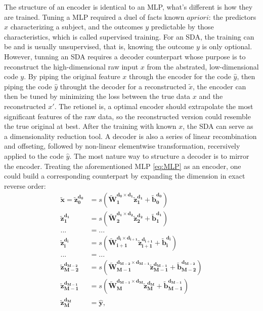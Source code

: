 The structure of an encoder is identical to an MLP, what's different is how they are trained. Tuning a MLP required a duel of facts known $a priori$: the predictors $x$ characterizing a subject, and the outcomes $y$ predictable by those characteristics, which is called supervised training. For an SDA, the training can be and is usually unsupervised, that is, knowing the outcome $y$ is only optional. However, tunning an SDA requires a decoder counterpart whose purpose is to reconstruct the  high-dimensional raw input $x$ from the abstrated, low-dimensional code $y$. By piping the original feature $x$ through the encoder for the code $\hat{y}$, then piping the code $\hat{y}$ throught the decoder for a reconstructed $\tilde{x}$, the encoder can then be tuned by minimizing the loss between the true data $x$ and the reconstructed $x'$. The retionel is, a optimal encoder should extrapolate the most significant features of the raw data, so the reconstructed version could resemble the true original at best. After the training with known $x$, the SDA can serve as a dimensionality reduction tool.
A decoder is also a series of linear recombination and offseting, followed by non-linear elementwise transformation, recersively applied to the code $\hat{y}$. The most nature way to structure a decoder is to mirror the encoder. Treating the aforementioned MLP \ref{eq:MLP} as an encoder, one could build a corresponding counterpart by expanding the dimension in exact reverse order:
\begin{equation} \label{eq:DEC}
\begin{split}
  \boldsymbol{\tilde{x}}=
  \boldsymbol{\tilde{z}_{0  }^{d_{0  }}} &= s(\boldsymbol{\tilde{W}_{1  }^{d_{0  } \times d_{1  }} \tilde{z}_{1  }^{d_{1  }}}+\boldsymbol{\tilde{b}_{0  }^{d_{0  }}}) \\
  \boldsymbol{\tilde{z}_{1  }^{d_{1  }}} &= s(\boldsymbol{\tilde{W}_{2  }^{d_{1  } \times d_{2  }} \tilde{z}_{2  }^{d_{2  }}}+\boldsymbol{\tilde{b}_{1  }^{d_{1  }}}) \\
  ... &= ... \\
  \boldsymbol{\tilde{z}_{i  }^{d_{i  }}} &= s(\boldsymbol{\tilde{W}_{i+1}^{d_{i  } \times d_{i+1}} \tilde{z}_{i+1}^{d_{i+1}}}+\boldsymbol{\tilde{b}_{i  }^{d_{i  }}}) \\
  ... &= ... \\
  \boldsymbol{\tilde{z}_{M-2}^{d_{M-2}}} &= s(\boldsymbol{\tilde{W}_{M-1}^{d_{M-2} \times d_{M-1}} \tilde{z}_{M-1}^{d_{M-1}}}+\boldsymbol{\tilde{b}_{M-2}^{d_{M-2}}}) \\
  \boldsymbol{\tilde{z}_{M-1}^{d_{M-1}}} &= s(\boldsymbol{\tilde{W}_{M  }^{d_{M-1} \times d_{M  }} \tilde{z}_{M  }^{d_{M  }}}+\boldsymbol{\tilde{b}_{M-1}^{d_{M-1}}}) \\
  \boldsymbol{\tilde{z}_{M  }^{d_{M  }}} &= \boldsymbol{\hat{y}},
\end{split}
\end{equation}

